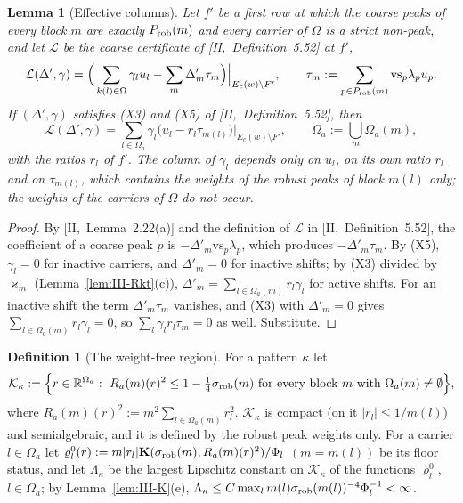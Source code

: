 \documentclass[10pt]{amsart}
\newtheorem{lemma}[theorem]{Lemma}
\theoremstyle{definition}
\newtheorem{definition}[theorem]{Definition}
\theoremstyle{remark}
\newcommand{\R}{\mathbb R}
\begin{document}
\begin{lemma}[Effective columns]\label{lem:III-EC}
Let $f'$ be a first row at which the coarse peaks of every block $m$ are
exactly $P_{\rm rob}(m)$ and every carrier of $\Omega$ is a strict non-peak, and
let $\mathcal L$ be the coarse certificate of [II,~Definition~5.52] at $f'$,
\[
 \mathcal L(\Delta',\gamma)=\Big(\sum_{k(l)\in\Omega}\gamma_lu_l-\sum_m\Delta'_m
 \tau_m\Big)\Big|_{E_c(w)\setminus F'},\qquad
 \tau_m:=\sum_{p\in P_{\rm rob}(m)}\mathrm{vs}_p\lambda_pu_p .
\]
If $(\Delta',\gamma)$ satisfies \textup{(X3)} and \textup{(X5)} of
[II,~Definition~5.52], then
\[
 \mathcal L(\Delta',\gamma)=\sum_{l\in\Omega_a}\gamma_l\big(u_l-r_l\tau_{m(l)}
 \big)\Big|_{E_c(w)\setminus F'},\qquad\Omega_a:=\bigcup_m\Omega_a(m),
\]
with the ratios $r_l$ of $f'$.  The column of $\gamma_l$ depends only on
$u_l$, on its own ratio $r_l$ and on $\tau_{m(l)}$, which contains the weights
of the robust peaks of block $m(l)$ only; the weights of the carriers of
$\Omega$ do not occur.
\end{lemma}

\begin{proof}
By [II,~Lemma~2.22(a)] and the definition of $\mathcal L$ in [II,~Definition~5.52],
the coefficient of a coarse peak $p$ is $-\Delta'_m\mathrm{vs}_p\lambda_p$, which
produces $-\Delta'_m\tau_m$.  By (X5), $\gamma_l=0$ for inactive carriers, and
$\Delta'_m=0$ for inactive shifts; by (X3) divided by $\varkappa_m$
(Lemma~\ref{lem:III-Rkt}(c)), $\Delta'_m=\sum_{l\in\Omega_a(m)}r_l\gamma_l$ for
active shifts.  For an inactive shift the term $\Delta'_m\tau_m$ vanishes,
and (X3) with $\Delta'_m=0$ gives $\sum_{l\in\Omega_a(m)}r_l\gamma_l=0$, so
$\sum_l\gamma_lr_l\tau_m=0$ as well.
Substitute.
\end{proof}

\begin{definition}[The weight-free region]\label{def:III-region}
For a pattern $\kappa$ let
\[
 \mathcal K_\kappa:=\Big\{r\in\R^{\Omega_a}:\ R_a(m)(r)^2\le1-\tfrac14
 \sigma_{\rm rob}(m)\ \text{for every block $m$ with}\ \Omega_a(m)\ne\emptyset
 \Big\},
\]
where $R_a(m)(r)^2:=m^2\sum_{l\in\Omega_a(m)}r_l^2$.  $\mathcal K_\kappa$ is
compact (on it $|r_l|\le1/m(l)$) and semialgebraic, and it is defined by
the robust peak weights only.  For a carrier $l\in\Omega_a$ let $\varrho^0_l(r):=
m|r_l|\mathbf K(\sigma_{\rm rob}(m),R_a(m)(r)^2)/\Phi_l$ $(m=m(l))$ be its floor
status, and let $\Lambda_\kappa$ be the largest Lipschitz constant on
$\mathcal K_\kappa$ of the functions $\varrho^0_l$, $l\in\Omega_a$; by
Lemma~\ref{lem:III-K}(e), $\Lambda_\kappa\le C\max_lm(l)\sigma_{\rm rob}(m(l))^{-4}
\Phi_l^{-1}<\infty$.
\end{definition}
\end{document}
